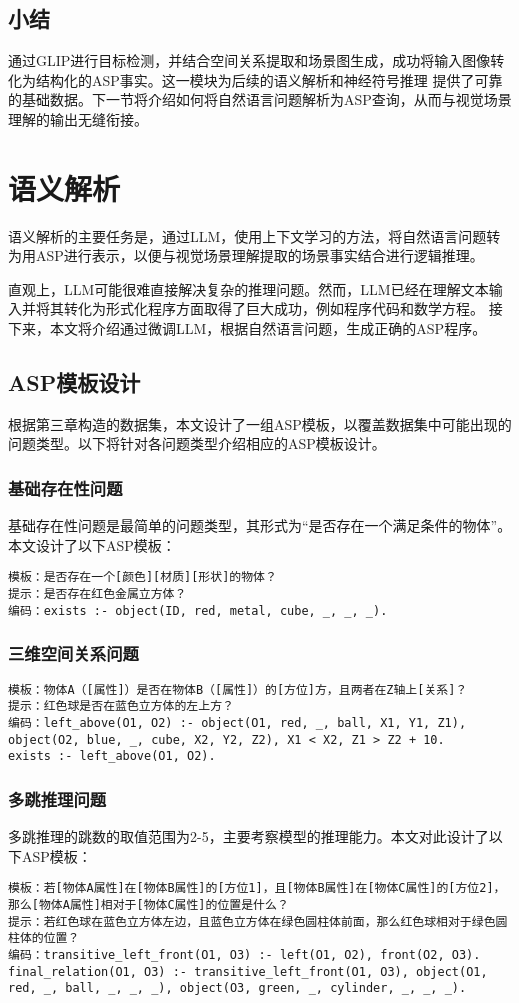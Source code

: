 \subsection{小结}
通过GLIP进行目标检测，并结合空间关系提取和场景图生成，成功将输入图像转化为结构化的ASP事实。这一模块为后续的语义解析和神经符号推理
提供了可靠的基础数据。下一节将介绍如何将自然语言问题解析为ASP查询，从而与视觉场景理解的输出无缝衔接。
\section{语义解析}
语义解析的主要任务是，通过LLM，使用上下文学习的方法，将自然语言问题转为用ASP进行表示，以便与视觉场景理解提取的场景事实结合进行逻辑推理。

直观上，LLM可能很难直接解决复杂的推理问题。然而，LLM已经在理解文本输入并将其转化为形式化程序方面取得了巨大成功，例如程序代码\cite{gao2023pal}和数学方程\cite{he2023solving}。
接下来，本文将介绍通过微调LLM，根据自然语言问题，生成正确的ASP程序。

\subsection{ASP模板设计}
根据第三章构造的数据集，本文设计了一组ASP模板，以覆盖数据集中可能出现的问题类型。以下将针对各问题类型介绍相应的ASP模板设计。
\subsubsection{基础存在性问题}
基础存在性问题是最简单的问题类型，其形式为“是否存在一个满足条件的物体”。本文设计了以下ASP模板：
\begin{lstlisting}
模板：是否存在一个[颜色][材质][形状]的物体？
提示：是否存在红色金属立方体？
编码：exists :- object(ID, red, metal, cube, _, _, _).
\end{lstlisting}
\subsubsection{三维空间关系问题}

\begin{lstlisting}
模板：物体A（[属性]）是否在物体B（[属性]）的[方位]方，且两者在Z轴上[关系]？
提示：红色球是否在蓝色立方体的左上方？
编码：left_above(O1, O2) :- object(O1, red, _, ball, X1, Y1, Z1), object(O2, blue, _, cube, X2, Y2, Z2), X1 < X2, Z1 > Z2 + 10.
exists :- left_above(O1, O2).
\end{lstlisting}
\subsubsection{多跳推理问题}
多跳推理的跳数的取值范围为2-5，主要考察模型的推理能力。本文对此设计了以下ASP模板：
\begin{lstlisting}
模板：若[物体A属性]在[物体B属性]的[方位1]，且[物体B属性]在[物体C属性]的[方位2]，那么[物体A属性]相对于[物体C属性]的位置是什么？
提示：若红色球在蓝色立方体左边，且蓝色立方体在绿色圆柱体前面，那么红色球相对于绿色圆柱体的位置？
编码：transitive_left_front(O1, O3) :- left(O1, O2), front(O2, O3).
final_relation(O1, O3) :- transitive_left_front(O1, O3), object(O1, red, _, ball, _, _, _), object(O3, green, _, cylinder, _, _, _).
\end{lstlisting}
